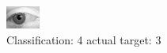 \begin{figure}[h!]
\begin{center}
\includegraphics[width=0.60\columnwidth]{figures/ID2846_class_4_target_3.png}
\end{center}
\caption{ Classification: 4 actual target: 3}
\label{fig:ID2846_class_4_target_3}
\end{figure}
